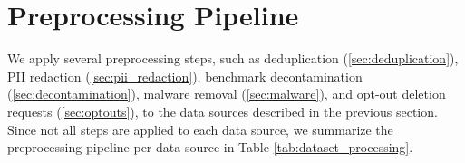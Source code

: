 \documentclass[10pt]{article} %
\begin{document}


\section{Preprocessing Pipeline}
We apply several preprocessing steps, such as deduplication (\cref{sec:deduplication}), PII redaction (\cref{sec:pii_redaction}), benchmark decontamination (\cref{sec:decontamination}), malware removal (\cref{sec:malware}), and opt-out deletion requests (\cref{sec:optouts}), to the data sources described in the previous section. Since not all steps are applied to each data source, we summarize the preprocessing pipeline per data source in Table \ref{tab:dataset_processing}. 
\end{document}
